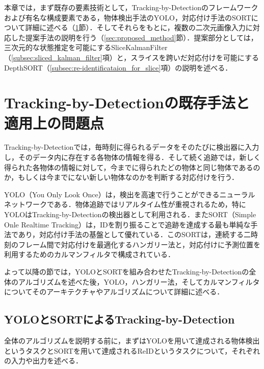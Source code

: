 \thispagestyle{fancy2}

本章では，まず既存の要素技術として，Tracking-by-Detectionのフレームワークおよび有名な構成要素である，物体検出手法のYOLO，対応付け手法のSORTについて詳細に述べる（\ref{sec:existing_method}節）．そしてそれらをもとに，複数の二次元画像入力に対応した提案手法の説明を行う（\ref{sec:proposed_method}節）．提案部分としては，三次元的な状態推定を可能にするSliceKalmanFilter（\ref{subsec:sliced_kalman_filter}項）と，スライスを跨いだ対応付けを可能にするDepthSORT（\ref{subsec:re-identificataion_for_slice}項）の説明を述べる．

\section{Tracking-by-Detectionの既存手法と適用上の問題点}
\label{sec:existing_method}

Tracking-by-Detectionでは，毎時刻に得られるデータをそのたびに検出器に入力し，そのデータ内に存在する各物体の情報を得る．そして続く追跡では，新しく得られた各物体の情報に対して，今までに得られたどの物体と同じ物体であるのか，もしくは今までにない新しい物体なのかを判断する対応付けを行う．

YOLO（You Only Look Once）\cite{redmon2016you, alif2024yolov1}は，検出を高速で行うことができるニューラルネットワークである．物体追跡ではリアルタイム性が重視されるため，特にYOLOはTracking-by-Detectionの検出器として利用される．またSORT（Simple Onle Realtime Tracking）\cite{bewley2016simple,wojke2017simple,du2023strongsort}は，IDを割り振ることで追跡を達成する最も単純な手法であり，対応付け手法の基盤として優れている．このSORTは，連続する二時刻のフレーム間で対応付けを最適化するハンガリー法\cite{kuhn1955hungarian}と，対応付けに予測位置を利用するためのカルマンフィルタ\cite{bishop2001introduction}で構成されている．

よって以降の節では，YOLOとSORTを組み合わせたTracking-by-Detectionの全体のアルゴリズムを述べた後，YOLO，ハンガリー法，そしてカルマンフィルタについてそのアーキテクチャやアルゴリズムについて詳細に述べる．

    \subsection{YOLOとSORTによるTracking-by-Detection}
    \label{subsec:yolo_and_sort}
    
    全体のアルゴリズムを説明する前に，まずはYOLOを用いて達成される物体検出というタスクとSORTを用いて達成されるReIDというタスクについて，それぞれの入力や出力を述べる．

